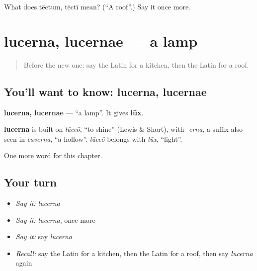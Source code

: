 \begin{tcolorbox}[breakable,colback=teal!4,colframe=teal!35!black,title={Before you move on}]
What does tēctum, tēctī mean? (\textquotedblleft{}A roof\textquotedblright{}.) Say it once more.
\end{tcolorbox}
\section[lucerna, lucernae]{lucerna, lucernae — a lamp}

\label{lesson:LA-C83-lucerna}



\begin{quote}
Before the new one: say the Latin for a kitchen, then the Latin for a roof.
\end{quote}

\subsection*{You'll want to know: lucerna, lucernae}
\textbf{lucerna, lucernae} — \textquotedblleft{}a lamp\textquotedblright{}. It gives \textbf{lūx}.

\begin{cousinweb}
\textbf{lucerna} is built on \emph{lūceō}, \textquotedblleft{}to shine\textquotedblright{} (Lewis \& Short), with \emph{-erna}, a suffix also seen in \emph{caverna}, \textquotedblleft{}a hollow\textquotedblright{}. \emph{lūceō} belongs with \emph{lūx}, \textquotedblleft{}light\textquotedblright{}.
\end{cousinweb}

\begin{grammarlens}[title={What you've built}]
One more word for this chapter.
\end{grammarlens}

\subsection*{Your turn}
\begin{itemize}
\raggedright
  \item \emph{Say it:} \emph{lucerna}
  \item \emph{Say it:} \emph{lucerna}, once more
  \item \emph{Say it:} say \emph{lucerna}
  \item \emph{Recall:} say the Latin for a kitchen, then the Latin for a roof, then say \emph{lucerna} again
\end{itemize}

